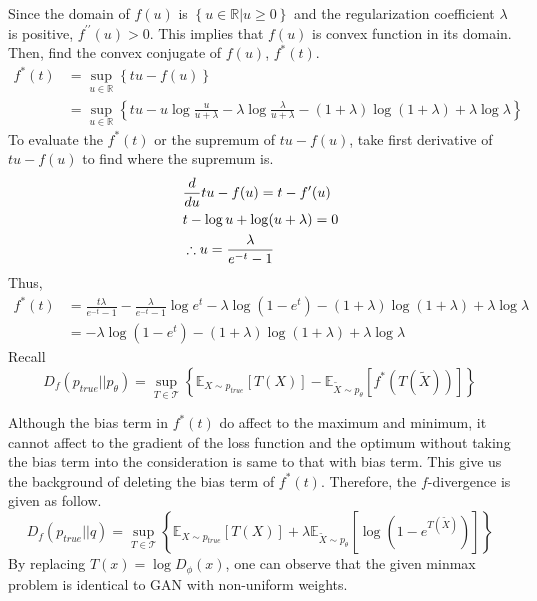 \documentclass[10pt]{article}
\begin{document}
Since the domain of $f(u)$ is $\left\{u\in \mathbb{R} | u \ge 0\right\}$ and the regularization coefficient $\lambda$ is positive, $f^{\prime\prime}(u)>0$.
This implies that $f(u)$ is convex function in its domain.
Then, find the convex conjugate of $f(u)$, $f^*(t)$.
\begin{align*}
    f^*(t) &= \underset{u\in\mathbb{R}}{\sup}\left\{tu - f(u)\right\} \\
    &= \underset{u\in\mathbb{R}}{\sup}\left\{tu - u\log\frac{u}{u+\lambda} - \lambda \log \frac{\lambda}{u + \lambda} - (1+\lambda)\log(1+\lambda) +\lambda \log \lambda\right\}
\end{align*}
To evaluate the $f^*(t)$ or the supremum of $tu-f(u)$, take first derivative of $tu-f(u)$ to find where the supremum is.
\begin{align*}
    &{d\over du} tu-f(u) =  t - f^\prime(u) \\
    &t-\log u + \log(u+\lambda) = 0  \\
    & \therefore u = \frac{\lambda}{e^{-t}-1}
\end{align*}
Thus, \begin{align*}
    f^*(t) &= \frac{t\lambda}{e^{-t}-1} - \frac{\lambda}{e^{-t}-1}\log e^t - \lambda \log(1-e^t) -(1+\lambda)\log(1+\lambda) + \lambda \log \lambda\\
    &=-\lambda \log(1-e^t) -(1+\lambda)\log(1+\lambda) + \lambda \log \lambda
\end{align*}
Recall \begin{equation*}
    D_f(p_{true}||p_\theta) = \underset{T\in\mathcal{T}}{\sup}\left\{\mathbb{E}_{X\sim p_{true}}[T(X)] - \mathbb{E}_{\tilde{X}\sim p_\theta}[f^*(T(\tilde{X}))]\right\}
\end{equation*}

Although the bias term in $f^*(t)$ do affect to the maximum and minimum, it cannot affect to the gradient of the loss function and the optimum without taking the bias term into the consideration is same to that with bias term. This give us the background of deleting the bias term of $f^*(t)$.
Therefore, the $f$-divergence is given as follow.
\begin{equation*}
    D_f(p_{true}||q) = \underset{T\in \mathcal{T}}{\sup}\left\{\mathbb{E}_{X\sim p_{true}}[T(X)] + \lambda \mathbb{E}_{\tilde{X} \sim p_\theta}\left[\log(1-e^{T(\tilde{X})})\right]\right\}
\end{equation*} 
By replacing $T(x) = \log D_{\phi}(x)$, one can observe that the given minmax problem is identical to GAN with non-uniform weights.
\end{document}

